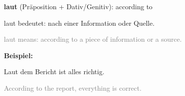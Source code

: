 \documentclass[a4paper]{article}
\title{}
\date{}
\author{Mohammad Rahmani}
\begin{document}
    \maketitle
    \textbf{laut} (Präposition + Dativ/Genitiv): according to
    
    laut bedeutet: nach einer Information oder Quelle.
        
        {\small\textcolor{gray}{laut means: according to a piece of information or a source.}}
    
    \textbf{Beispiel:}
    
    Laut dem Bericht ist alles richtig.
        
        {\small\textcolor{gray}{According to the report, everything is correct.}}
    
    
\end{document}
